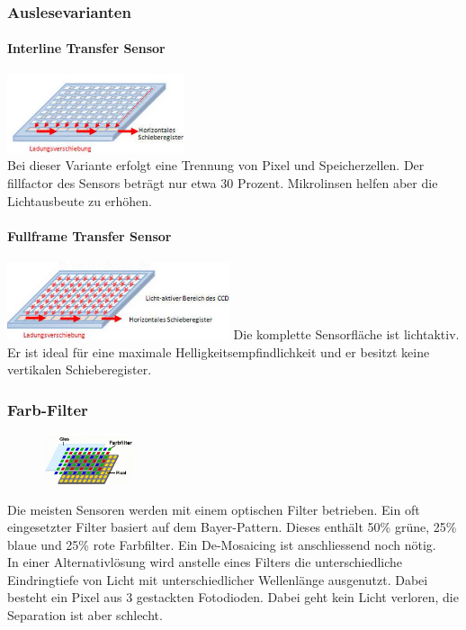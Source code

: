 \subsubsection{Auslesevarianten}
\begin{multicols}{2}
    \paragraph{Interline Transfer Sensor}
    \includegraphics[width=0.39\textwidth]{images/ccd_interline} \\
    Bei dieser Variante erfolgt eine Trennung von Pixel und Speicherzellen. Der fillfactor des Sensors beträgt nur etwa 30 Prozent. Mikrolinsen helfen aber die Lichtausbeute zu erhöhen.
    
    \paragraph{Fullframe Transfer Sensor}
    \includegraphics[width=0.49\textwidth]{images/ccd_fullframe}
    Die komplette Sensorfläche ist lichtaktiv. Er ist ideal für eine maximale Helligkeitsempfindlichkeit und er besitzt keine vertikalen Schieberegister. 
\end{multicols}

\subsubsection{Farb-Filter}
\begin{figure}
    \centering
    \includegraphics[width=0.24\textwidth]{images/ccd_filter}
\end{figure}
Die meisten Sensoren werden mit einem optischen Filter betrieben. Ein oft eingesetzter Filter basiert auf dem Bayer-Pattern. Dieses enthält 50\% grüne, 25\% blaue und 25\% rote Farbfilter. Ein De-Mosaicing ist anschliessend noch nötig. \\
In einer Alternativlösung wird anstelle eines Filters die unterschiedliche Eindringtiefe von Licht mit unterschiedlicher Wellenlänge ausgenutzt. Dabei besteht ein Pixel aus 3 gestackten Fotodioden. Dabei geht kein Licht verloren, die Separation ist aber schlecht.


